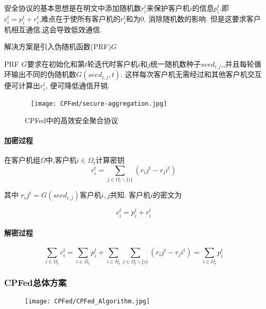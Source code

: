  
安全协议的基本思想是在明文中添加随机数$r_i^t$来保护客户机$i$的信息$p_i^t$.即$c^t_i = p^t_i +r^t_i$,难点在于使所有客户机的$r^t_i$和为0, 消除随机数的影响. 但是这要求客户机相互通信,这会导致低效通信.

解决方案是引入伪随机函数(PRF)$G$

PRF $G$要求在初始化和第$t$轮迭代时客户机$i$和$j$统一随机数种子$seed_{i,j}$,,并且每轮循环输出不同的伪随机数$G(seed_{i,j},t)$. 这样每次客户机无需经过和其他客户机交互便可计算出$r_i^t$, 便可降低通信开销.

\begin{figure}[ht]
    \
    \setlength{\abovecaptionskip}{0.1cm}
    \centering    
    \texttt{[image: CPFed/secure-aggregation.jpg]}
    \caption{CPFed中的高效安全聚合协议}
\end{figure}
 
\paragraph{加密过程}
在客户机组$\Omega$中,客户机$i \in \Omega_t$计算密钥
\begin{equation}
    r_i^t= \sum_{j \in \Omega_t \backslash \{i\}}(r_ij^t-r_ji^t)
\end{equation}

其中 $r_ij^t=G(seed_{i,j})$客户机$i,j$共知. 客户机$i$的密文为

\begin{equation}
    c_i^t=p_i^t+ r_i^t 
\end{equation}

\paragraph{解密过程}

\begin{equation}
    \sum_{i \in \Omega_t} c_i^t=   \sum_{i \in \Omega_t} p_i^t +   \sum_{i \in \Omega_t}   \sum_{j \in \Omega_t \backslash\{i\}} (r_ij^t-r_ji^t) = \sum_{i \in \Omega_t} p_i^t 
\end{equation}

\subsubsection{CPFed总体方案}
\begin{figure}[ht]
    \setlength{\abovecaptionskip}{0.1cm}
    \centering    
    \texttt{[image: CPFed/CPFed\_Algorithm.jpg]}
    \label{CPFed_algorithm}
\end{figure}

